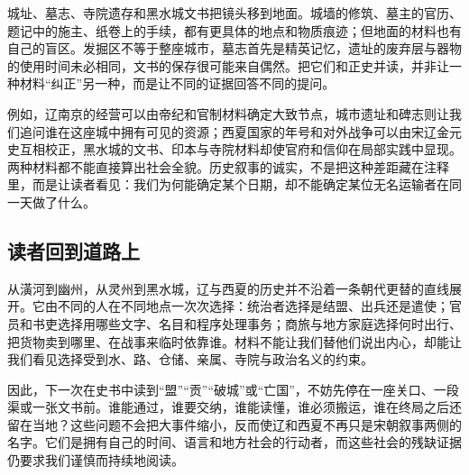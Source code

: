 城址、墓志、寺院遗存和黑水城文书把镜头移到地面。城墙的修筑、墓主的官历、题记中的施主、纸卷上的手续，都有更具体的地点和物质痕迹；但地面的材料也有自己的盲区。发掘区不等于整座城市，墓志首先是精英记忆，遗址的废弃层与器物的使用时间未必相同，文书的保存很可能来自偶然。把它们和正史并读，并非让一种材料“纠正”另一种，而是让不同的证据回答不同的提问。

例如，辽南京的经营可以由帝纪和官制材料确定大致节点，城市遗址和碑志则让我们追问谁在这座城中拥有可见的资源；西夏国家的年号和对外战争可以由宋辽金元史互相校正，黑水城的文书、印本与寺院材料却使官府和信仰在局部实践中显现。两种材料都不能直接算出社会全貌。历史叙事的诚实，不是把这种差距藏在注释里，而是让读者看见：我们为何能确定某个日期，却不能确定某位无名运输者在同一天做了什么。

\subsection{读者回到道路上}

从潢河到幽州，从灵州到黑水城，辽与西夏的历史并不沿着一条朝代更替的直线展开。它由不同的人在不同地点一次次选择：统治者选择是结盟、出兵还是遣使；官员和书吏选择用哪些文字、名目和程序处理事务；商旅与地方家庭选择何时出行、把货物卖到哪里、在战事来临时依靠谁。材料不能让我们替他们说出内心，却能让我们看见选择受到水、路、仓储、亲属、寺院与政治名义的约束。

因此，下一次在史书中读到“盟”“贡”“破城”或“亡国”，不妨先停在一座关口、一段渠或一张文书前。谁能通过，谁要交纳，谁能读懂，谁必须搬运，谁在终局之后还留在当地？这些问题不会把大事件缩小，反而使辽和西夏不再只是宋朝叙事两侧的名字。它们是拥有自己的时间、语言和地方社会的行动者，而这些社会的残缺证据仍要求我们谨慎而持续地阅读。


